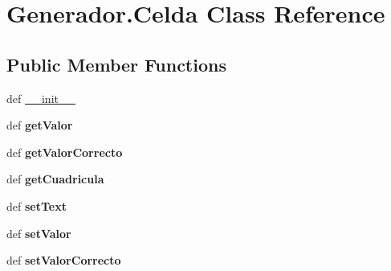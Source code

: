 \hypertarget{class_generador_1_1_celda}{\section{Generador.\-Celda Class Reference}
\label{class_generador_1_1_celda}
}
\subsection*{Public Member Functions}
\begin{DoxyCompactItemize}
\item 
def \hyperlink{class_generador_1_1_celda_a99ba14581c4f92d9402fadd2df1259ef}{\-\_\-\-\_\-init\-\_\-\-\_\-}
\item 
\hypertarget{class_generador_1_1_celda_a00598ee2bc359706b3255aef3a3e6b95}{def {\bfseries get\-Valor}}\label{class_generador_1_1_celda_a00598ee2bc359706b3255aef3a3e6b95}

\item 
\hypertarget{class_generador_1_1_celda_a42ff22e50d1bd29e5b40bf4472ba655b}{def {\bfseries get\-Valor\-Correcto}}\label{class_generador_1_1_celda_a42ff22e50d1bd29e5b40bf4472ba655b}

\item 
\hypertarget{class_generador_1_1_celda_aa4450e9534af1616749a7ba0f4cd79c0}{def {\bfseries get\-Cuadricula}}\label{class_generador_1_1_celda_aa4450e9534af1616749a7ba0f4cd79c0}

\item 
\hypertarget{class_generador_1_1_celda_a767d397f9c7c4b24d2fc47faff43d3bc}{def {\bfseries set\-Text}}\label{class_generador_1_1_celda_a767d397f9c7c4b24d2fc47faff43d3bc}

\item 
\hypertarget{class_generador_1_1_celda_ab76b2b964a6ab2735fb9e0d0ba339a22}{def {\bfseries set\-Valor}}\label{class_generador_1_1_celda_ab76b2b964a6ab2735fb9e0d0ba339a22}

\item 
\hypertarget{class_generador_1_1_celda_ab3309853db0d2ce4f8c41236688e66b7}{def {\bfseries set\-Valor\-Correcto}}\label{class_generador_1_1_celda_ab3309853db0d2ce4f8c41236688e66b7}

\end{DoxyCompactItemize}
